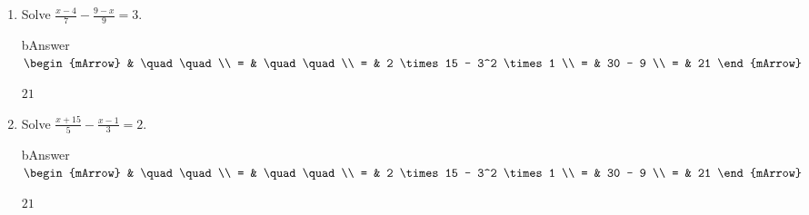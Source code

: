 \clearpage

\clearpage
\begin{enumerate}
  \item \begin{exercise} Solve $ \frac{x-4}{7} - \frac{9-x}{9} = 3 $.
        \begin{envOut}[height=11cm]{bAnswer}
		     $\begin{mArrow}
		        & \quad\quad                      \\ 
              = & \quad\quad                      \\ 
              = & 2 \times 15 - 3^2 \times 1     \\ 
              = & 30 - 9                         \\
              = & 21						  
	         \end{mArrow}$
        \end{envOut}			  
	    \begin{shortsolution}$21$\end{shortsolution}
	  \end{exercise}

  \item \begin{exercise} Solve $ \frac{x+15}{5} - \frac{x-1}{3} = 2 $.
        \begin{envOut}[height=11cm]{bAnswer}
		     $\begin{mArrow}
		        & \quad\quad                      \\ 
              = & \quad\quad      \\ 
              = & 2 \times 15 - 3^2 \times 1     \\ 
              = & 30 - 9                       \\
              = & 21						  
	         \end{mArrow}$
        \end{envOut}			  
	    \begin{shortsolution}$21$\end{shortsolution}
	  \end{exercise}

\end{enumerate}

